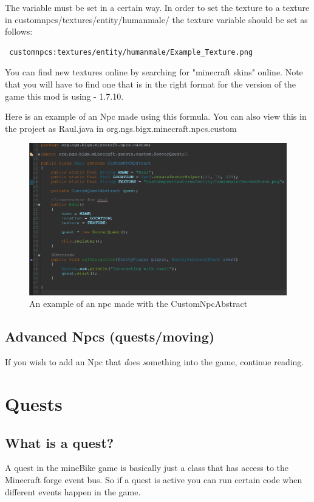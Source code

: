 \documentclass[12pt]{article}
\begin{document}
The variable must be set in a certain way. In order to set the texture to a texture in customnpcs/textures/entity/humanmale/ the texture variable should be set as follows: \begin{verbatim} customnpcs:textures/entity/humanmale/Example_Texture.png \end{verbatim}

You can find new textures online by searching for "minecraft skins" online. Note that you will have to find one that is in the right format for the version of the game this mod is using - 1.7.10.

Here is an example of an Npc made using this formula. You can also view this in the project as Raul.java in org.ngs.bigx.minecraft.npcs.custom

\begin{figure}[H]
	\caption{An example of an npc made with the CustomNpcAbstract}
	\includegraphics[scale=0.3]{images/npcs/Raul_Java.png}
	\centering
\end{figure}

\subsection{Advanced Npcs (quests/moving)}

If you wish to add an Npc that {\emph does \emph something} into the game, continue reading.

\section{Quests}
\label{sec:quests}

\subsection{What is a quest?}
A quest in the mineBike game is basically just a class that has access to the Minecraft forge event bus. So if a quest is active you can run certain code when different events happen in the game. 
\end{document}
